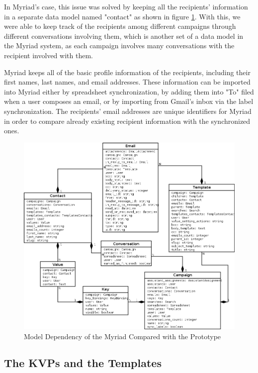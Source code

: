 In Myriad's case, this issue was solved by keeping all the recipients' information in a separate data model named "contact" as shown in figure \ref{fig:UML_Draw_Final}. With this, we were able to keep track of the recipients among different campaigns through different conversations involving them, which is another set of a data model in the Myriad system, as each campaign involves many conversations with the recipient involved with them.
\vspace{1cm}

Myriad keeps all of the basic profile information of the recipients, including their first names, last names, and email addresses. These information can be imported into Myriad either by spreadsheet synchronization, by adding them into "To" filed when a user composes an email, or by importing from Gmail's inbox via the label synchronization. The recipients' email addresses are unique identifiers for Myriad in order to compare already existing recipient information with the synchronized ones. 

\begin{figure}[htbp]
	\centering
	\includegraphics[width=1.00\textwidth]{imgs/UML_Draw_Final.png}
	\caption[Model Dependency of the Myriad Compared with the Prototype]{Model Dependency of the Myriad Compared with the Prototype}
	\label{fig:UML_Draw_Final}
\end{figure}

\subsection{The \ac{KVP}s and the Templates}
\label{subsec:5.3.2:KVPsTemp}

